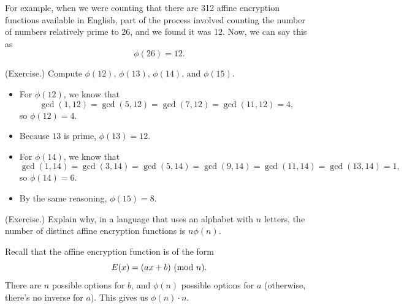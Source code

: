 \documentclass[letterpaper]{article}
\begin{document}
For example, when we were counting that there are 312 affine encryption functions available in English, part of the process involved counting the number of numbers relatively prime to 26, and we found it was 12. Now, we can say this as \[\phi(26) = 12.\]

\begin{mdframed}
    (Exercise.) Compute $\phi(12)$, $\phi(13)$, $\phi(14)$, and $\phi(15)$. 
    \begin{mdframed}
        \begin{itemize}
            \item For $\phi(12)$, we know that 
            \[\gcd(1, 12) = \gcd(5, 12) = \gcd(7, 12) = \gcd(11, 12) = 4,\]
            so $\phi(12) = 4$. 

            \item Because $13$ is prime, $\phi(13) = 12$. 
            
            \item For $\phi(14)$, we know that 
            \[\gcd(1, 14) = \gcd(3, 14) = \gcd(5, 14) = \gcd(9, 14) = \gcd(11, 14) = \gcd(13, 14) = 1,\]
            so $\phi(14) = 6$.


            \item By the same reasoning, $\phi(15) = 8$. 
        \end{itemize}
    \end{mdframed}
\end{mdframed}

\begin{mdframed}
    (Exercise.) Explain why, in a language that uses an alphabet with $n$ letters, the number of distinct affine encryption functions is $n\phi(n)$. 

    \begin{mdframed}
        Recall that the affine encryption function is of the form \[E(x) = (ax + b) \ (\mathrm{mod}\ n).\] There are $n$ possible options for $b$, and $\phi(n)$ possible options for $a$ (otherwise, there's no inverse for $a$). This gives us $\phi(n) \cdot n$. 
    \end{mdframed}
\end{mdframed}
\end{document}
